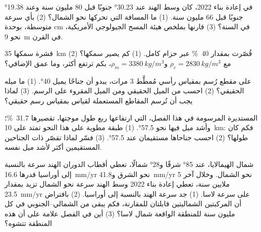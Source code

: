 \begin{exercise}[$\star\star$]\label{exo:g12:mountain-building:9}
في إعادة بناء 2022، كان وسط الهند عند \ang{30.23} جنوبًا قبل 80 مليون
سنة وعند \ang{19.38} جنوبًا قبل 66 مليون سنة. (1) ما المسافة التي
تحركها نحو الشمال؟ (2) بأي سرعة متوسطة، بوحدة \unit{cm} في السنة؟ (3) قارنها
بملخص هيئة المسح الجيولوجي الأمريكية، نحو \qty{9}{m} في القرن.
\end{exercise}

\begin{exercise}[$\star\star$]\label{exo:g12:mountain-building:10}
قشرة سمكها \qty{35}{km} قُصّرت بمقدار \qty{40}{\percent} عبر
حزام كامل. (1) كم يصير سمكها؟ (2) مع $\rho_c =
\qty{2830}{kg/m^3}$ و$\rho_m = \qty{3380}{kg/m^3}$، بكم ترتفع
أكثر، وما عمق  الإضافي؟
\end{exercise}

\begin{exercise}[$\star\star$]\label{exo:g12:mountain-building:11}
على مقطع رُسم بمقياس رأسي مُمطَّط 3 مرات، يبدو أن جناحًا
يميل \ang{40}. (1) ما ميله الحقيقي؟ (2) احسب  من
الميل الحقيقي ومن الميل المقروء على الرسم. (3) لماذا يجب أن تُرسم المقاطع المستعملة
لقياس  بمقياس رسم حقيقي؟
\end{exercise}

\begin{exercise}[$\star\star\star$]\label{exo:g12:mountain-building:12}
 المستديرة المرسومة في هذا الفصل، التي ارتفاعها ربع
طول موجتها، تقصيرها \qty{31.7}{\percent}؛ وأشد ميل فيها
نحو \ang{57.5}. (1) طبقة مطوية على هذا النحو تمتد على \qty{10}{km}: فكم
كان طولها؟ (2) احسب   جناحاها مستقيمان عند
\ang{57.5}. (3) فسّر لماذا تقصّر  ذات الجناحين المستقيمين أكثر لأشد
ميل نفسه.
\end{exercise}

\begin{exercise}[$\star\star\star$]\label{exo:g12:mountain-building:13}
شمال الهيمالايا، عند \ang{85} شرقًا و\ang{28} شمالًا، تعطي أقطاب الدوران الهند
سرعة بالنسبة إلى أوراسيا قدرها \qty{16.6}{mm/yr} نحو الشرق
و\qty{41.8}{mm/yr} نحو الشمال. وخلال آخر 5 ملايين سنة، تعطي إعادة بناء 2022
وسط الهند سرعة نحو الشمال تزيد بمقدار \qty{23.5}{mm/yr}
على سرعة لاسا. (1) جد سرعة الهند بالنسبة إلى
أوراسيا. (2) بافتراض أن المركبتين الشماليتين قابلتان للمقارنة، فكم يبقى من 
الشمالي--الجنوبي في كل مليون سنة للمنطقة الواقعة شمال
لاسا؟ (3) أين في الفصل علامة على أن هذه المنطقة تتشوه؟
\end{exercise}

